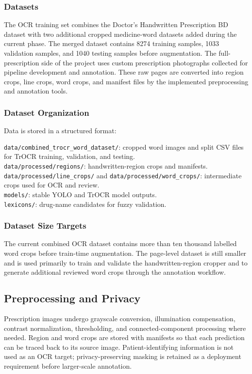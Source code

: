 \documentclass[twocolumn,10pt]{article}
\begin{document}
\subsubsection{Datasets}
The OCR training set combines the Doctor's Handwritten Prescription BD dataset with two additional cropped medicine-word datasets added during the current phase. The merged dataset contains 8274 training samples, 1033 validation samples, and 1040 testing samples before augmentation. The full-prescription side of the project uses custom prescription photographs collected for pipeline development and annotation. These raw pages are converted into region crops, line crops, word crops, and manifest files by the implemented preprocessing and annotation tools.


\subsubsection{Dataset Organization}
Data is stored in a structured format:

\texttt{data/combined\_trocr\_word\_dataset/}: cropped word images and split CSV files for TrOCR training, validation, and testing.\\
\texttt{data/processed/regions/}: handwritten-region crops and manifests.\\
\texttt{data/processed/line\_crops/} and \texttt{data/processed/word\_crops/}: intermediate crops used for OCR and review.\\
\texttt{models/}: stable YOLO and TrOCR model outputs.\\
\texttt{lexicons/}: drug-name candidates for fuzzy validation.


\subsubsection{Dataset Size Targets}

The current combined OCR dataset contains more than ten thousand labelled word crops before train-time augmentation. The page-level dataset is still smaller and is used primarily to train and validate the handwritten-region cropper and to generate additional reviewed word crops through the annotation workflow.


\subsection{Preprocessing and Privacy}
Prescription images undergo grayscale conversion, illumination compensation, contrast normalization, thresholding, and connected-component processing where needed. Region and word crops are stored with manifests so that each prediction can be traced back to its source image. Patient-identifying information is not used as an OCR target; privacy-preserving masking is retained as a deployment requirement before larger-scale annotation.
\end{document}

